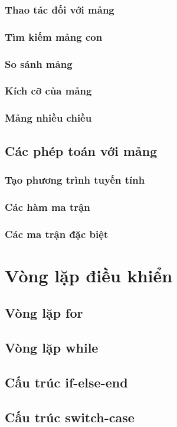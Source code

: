 \documentclass[12pt,a4paper]{article}
\begin{document}
\subsubsection{Thao tác đối với mảng}
\subsubsection{Tìm kiếm mảng con}
\subsubsection{So sánh mảng}
\subsubsection{Kích cỡ của mảng}
\subsubsection{Mảng nhiều chiều}
\subsection{Các phép toán với mảng}
\subsubsection{Tạo phương trình tuyến tính}
\subsubsection{Các hàm ma trận}
\subsubsection{Các ma trận đặc biệt}
\section{Vòng lặp điều khiển}
\subsection{Vòng lặp for}
\subsection{Vòng lặp while}
\subsection{Cấu trúc if-else-end}
\subsection{Cấu trúc switch-case}
\end{document}
